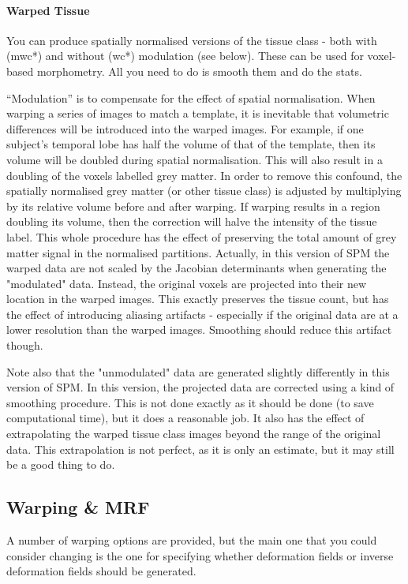 \paragraph{Warped Tissue}
You can produce spatially normalised versions of the tissue class - both with (mwc*) and without (wc*) modulation (see below). These can be used for voxel-based morphometry. All you need to do is smooth them and do the stats.



``Modulation'' is to compensate for the effect of spatial normalisation.  When warping a series of images to match a template, it is inevitable that volumetric differences will be introduced into the warped images.  For example, if one subject's temporal lobe has half the volume of that of the template, then its volume will be doubled during spatial normalisation. This will also result in a doubling of the voxels labelled grey matter.  In order to remove this confound, the spatially normalised grey matter (or other tissue class) is adjusted by multiplying by its relative volume before and after warping.  If warping results in a region doubling its volume, then the correction will halve the intensity of the tissue label. This whole procedure has the effect of preserving the total amount of grey matter signal in the normalised partitions.  Actually, in this version of SPM the warped data are not scaled by the Jacobian determinants when generating the "modulated" data.  Instead, the original voxels are projected into their new location in the warped images.  This exactly preserves the tissue count, but has the effect of introducing aliasing artifacts - especially if the original data are at a lower resolution than the warped images.  Smoothing should reduce this artifact though.

Note also that the "unmodulated" data are generated slightly differently in this version of SPM. In this version, the projected data are corrected using a kind of smoothing procedure. This is not done exactly as it should be done (to save computational time), but it does a reasonable job. It also has the effect of extrapolating the warped tissue class images beyond the range of the original data.  This extrapolation is not perfect, as it is only an estimate, but it may still be a good thing to do.


\subsection{Warping \& MRF}
A number of warping options are provided, but the main one that you could consider changing is the one for specifying whether deformation fields or inverse deformation fields should be generated.


